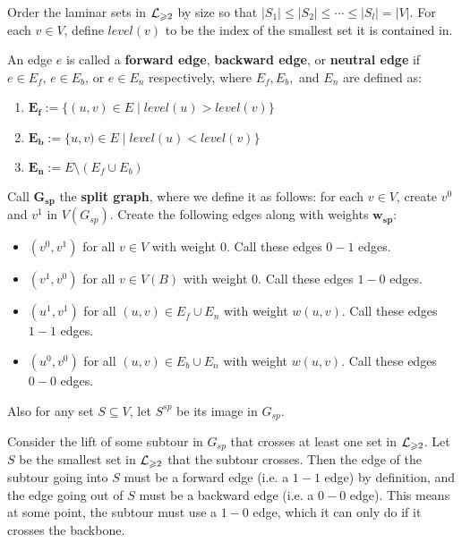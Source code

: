 \documentclass[./main.tex]{subfiles}
\begin{document}
			Order the laminar sets in $\mathcal{L}_{\geqslant 2}$ by size so that $|S_1|\leqslant |S_2|\leqslant\cdots\leqslant |S_l| = |V|$. For each $v\in V$, define $level(v)$ to be the index of the smallest set it is contained in.\vspace{2mm}
			\begin{definition}
				An edge $e$ is called a \textbf{forward edge}, \textbf{backward edge}, or \textbf{neutral edge} if $e\in E_f$, $e\in E_b$, or $e\in E_n$ respectively, where $E_f, E_b,$ and $E_n$ are defined as:
				\begin{enumerate}[$-$]
					\item $\bm{E_f}:=\{(u,v)\in E\mid level(u) > level(v)\}$
					\item $\bm{E_b}:=\{u,v)\in E\mid level(u) < level(v)\}$
					\item $\bm{E_n}:=E\setminus (E_f\cup E_b)$
				\end{enumerate}
			\end{definition}
			\vspace{2mm}\pagebreak[2]
			\begin{definition}
				Call $\bm{G_{sp}}$ the \textbf{split graph}, where we define it as follows: for each $v\in V$, create $v^0$ and $v^1$ in $V(G_{sp})$. Create the following edges along with weights $\bm{w_{sp}}$:
				\begin{itemize}[$-$]
					\item $(v^0, v^1)$ for all $v\in V$ with weight $0$. Call these edges $0-1$ edges.
					\item $(v^1, v^0)$ for all $v\in V(B)$ with weight $0$. Call these edges $1-0$ edges.
					\item $(u^1, v^1)$ for all $(u,v)\in E_f\cup E_n$ with weight $w(u,v)$. Call these edges $1-1$ edges.
					\item $(u^0, v^0)$ for all $(u,v)\in E_b\cup E_n$ with weight $w(u,v)$. Call these edges $0-0$ edges.
				\end{itemize}
				Also for any set $S\subseteq V$, let $S^{sp}$ be its image in $G_{sp}$.
			\end{definition}\vspace{2mm}
			Consider the lift of some subtour in $G_{sp}$ that crosses at least one set in $\mathcal{L}_{\geqslant 2}$. Let $S$ be the smallest set in $\mathcal{L}_{\geqslant 2}$ that the subtour crosses. 
			Then the edge of the subtour going into $S$ must be a forward edge (i.e. a $1-1$ edge) by definition, and the edge going out of $S$ must be a backward edge (i.e. a $0-0$ edge). This means at some point, the subtour must use a $1-0$ edge, which it can only do if it crosses the backbone.\\\vspace{1mm}
\end{document}
